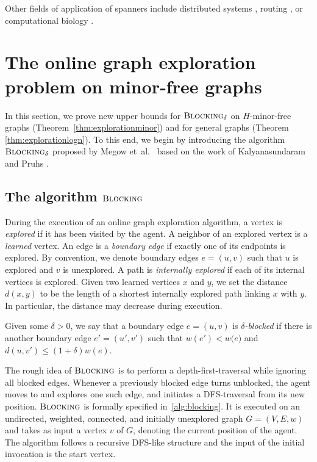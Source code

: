\documentclass[a4paper,cleveref, autoref, thm-restate, thm-restate, UKenglish]{lipics-v2021}
\newcommand{\dist}{d}
\newcommand{\blocking}{\textsc{Blocking}}
\begin{document}
Other fields of application of spanners include distributed systems \cite{distcomp}, routing \cite{routing}, or computational biology \cite{biology}.

\section{The online graph exploration problem on minor-free graphs}

In this section, we prove new upper bounds for $\blocking_\delta$ on  $H$-minor-free graphs (Theorem~\ref{thm:explorationminor}) and for general graphs (Theorem \ref{thm:explorationlogn}). To this end, we begin by introducing the algorithm $\blocking_\delta$ proposed by Megow et~al.~\cite{megow} based on the work of Kalyanasundaram and Pruhs \cite{pruhs94}.

\subsection{The algorithm $\blocking$}\label{sec:blocking}

During the execution of an online graph exploration algorithm, a vertex is \emph{explored} if it has been visited by the agent. A neighbor of an explored vertex is a \emph{learned} vertex.
An edge is a \emph{boundary edge} if exactly one of its endpoints is explored. 
By convention, we denote boundary edges $e=(u,v)$ such that $u$ is explored and $v$ is unexplored. 
A path is \emph{internally explored} if each of its internal vertices is explored.
Given two learned vertices $x$ and $y$, we set the distance $d(x,y)$ to be the length of a shortest internally explored path linking $x$ with $y$. 
In particular, the distance may decrease during execution.
\begin{definition}
Given some $\delta>0$, we say that a boundary edge $e=(u,v)$ is \emph{$\delta$-blocked} if there is another boundary edge $e'=(u',v')$ such \linebreak that ${w(e')<w(e})$ and $\dist (u, v') \leq (1+\delta)w(e)$. 
\end{definition}

The rough idea of $\blocking$ is to perform a depth-first-traversal while ignoring all blocked edges. Whenever a previously blocked edge turns unblocked, the agent moves to and explores one such edge, and initiates a DFS-traversal from its new position. 
$\blocking$ is formally specified in~\cref{alg:blocking}. 
It is executed on an undirected, weighted, connected, and initially unexplored graph $G=(V,E,w)$ and takes as input a vertex $v$ of $G$, denoting the current position of the agent. The algorithm follows a recursive DFS-like structure and the input of the initial invocation is the start vertex.
\end{document}
